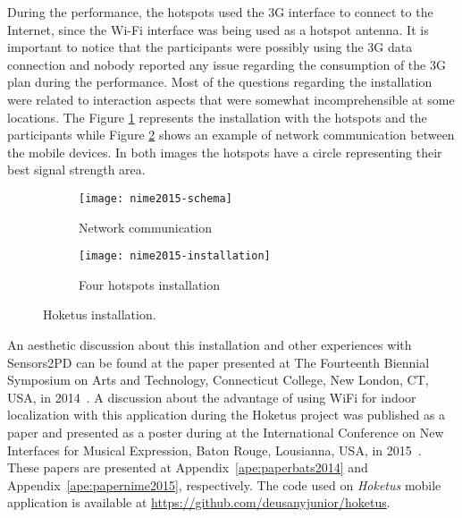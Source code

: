During the performance, the hotspots used the 3G interface to connect to the Internet, since the Wi-Fi interface was being used as a hotspot antenna. 
It is important to notice that the participants were possibly using the 3G data connection and nobody reported any issue regarding the consumption of the 3G plan during the performance.
Most of the questions regarding the installation were related to interaction aspects that were somewhat incomprehensible at some locations.
The Figure \ref{fig:installation} represents the installation with the hotspots and the participants while Figure \ref{fig:installation-schema} shows an example of network communication between the mobile devices. 
In both images the hotspots have a circle representing their best signal strength area.

\begin{figure*}[!ht]
\centering
\begin{subfigure}{.45\textwidth}
	\texttt{[image: nime2015-schema]}
    \caption{Network communication}
	\label{fig:installation}
\end{subfigure}
\begin{subfigure}{.45\textwidth}
	\texttt{[image: nime2015-installation]}
	\caption{Four hotspots installation}
	\label{fig:installation-schema}
\end{subfigure}

\caption{Hoketus installation.}
\label{fig:hoketusinstallation}
\end{figure*}

An aesthetic discussion about this installation and other experiences with Sensors2PD can be found at the paper presented at The Fourteenth Biennial Symposium on Arts and Technology, Connecticut College, New London, CT, USA, in 2014~\citep{Bandeira2014notes}.
A discussion about the advantage of using WiFi for indoor localization with this application during the Hoketus project was published as a paper and presented as a poster during at the International Conference on New Interfaces for Musical Expression, Baton Rouge, Lousianna, USA, in 2015~\citep{deCarvalhoJunior2015indoor}.
These papers are presented at Appendix~\ref{ape:paperbats2014} and Appendix~\ref{ape:papernime2015}, respectively.
The code used on \textit{Hoketus} mobile application is available at \url{https://github.com/deusanyjunior/hoketus}.


